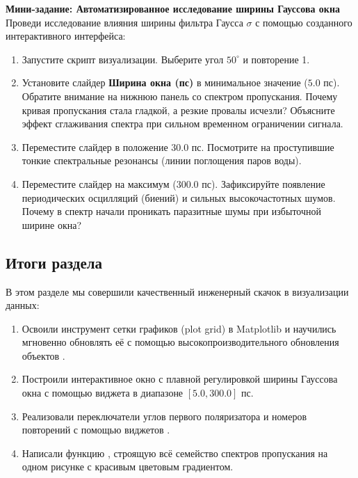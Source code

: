 \begin{minitaskbox}
	\textbf{Мини-задание: Автоматизированное исследование ширины Гауссова окна} \\
	Проведи исследование влияния ширины фильтра Гаусса $\sigma$ с помощью созданного интерактивного интерфейса: \\
	\begin{enumerate}
		\item Запустите скрипт визуализации. Выберите угол $50^\circ$ и повторение 1.
		\item Установите слайдер \textbf{Ширина окна (пс)} в минимальное значение ($5.0$ пс). Обратите внимание на нижнюю панель со спектром пропускания. Почему кривая пропускания стала гладкой, а резкие провалы исчезли? Объясните эффект сглаживания спектра при сильном временном ограничении сигнала.
		\item Переместите слайдер в положение $30.0$ пс. Посмотрите на проступившие тонкие спектральные резонансы (линии поглощения паров воды). 
		\item Переместите слайдер на максимум ($300.0$ пс). Зафиксируйте появление периодических осцилляций (биений) и сильных высокочастотных шумов. Почему в спектр начали проникать паразитные шумы при избыточной ширине окна?
	\end{enumerate}
\end{minitaskbox}

\subsection{Итоги раздела}

В этом разделе мы совершили качественный инженерный скачок в визуализации данных:
\begin{enumerate}
    \item Освоили инструмент сетки графиков (plot grid) в Matplotlib и научились мгновенно обновлять её с помощью высокопроизводительного обновления объектов .
    \item Построили интерактивное окно с плавной регулировкой ширины Гауссова окна с помощью виджета  в диапазоне $[5.0, 300.0]$ пс.
    \item Реализовали переключатели углов первого поляризатора и номеров повторений с помощью виджетов .
    \item Написали функцию , строящую всё семейство спектров пропускания на одном рисунке с красивым цветовым градиентом.
\end{enumerate}

